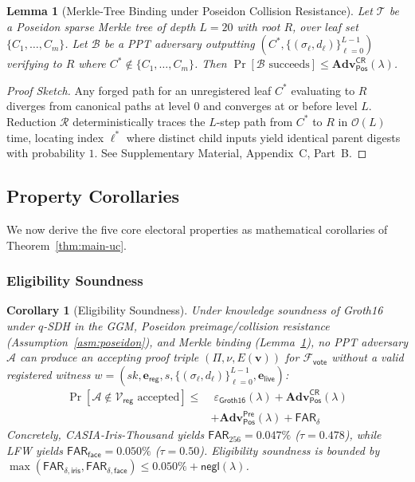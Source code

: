 \documentclass[10pt,letterpaper,journal]{IEEEtran}
\newtheorem{lemma}[theorem]{Lemma}
\newtheorem{corollary}[theorem]{Corollary}
\begin{document}
\begin{lemma}[Merkle-Tree Binding under Poseidon Collision Resistance]
\label{lem:merkle-binding}
Let $\mathcal{T}$ be a Poseidon sparse Merkle tree of depth $L=20$ with root $R$, over leaf set $\{C_1,\ldots,C_m\}$. Let $\mathcal{B}$ be a PPT adversary outputting $(C^\ast, \{(\sigma_\ell, d_\ell)\}_{\ell=0}^{L-1})$ verifying to $R$ where $C^\ast \notin \{C_1,\ldots,C_m\}$. Then $\Pr[\mathcal{B}\text{ succeeds}] \leq \mathbf{Adv}^{\mathsf{CR}}_{\mathsf{Pos}}(\lambda)$.
\end{lemma}

\begin{proof}[Proof Sketch]
Any forged path for an unregistered leaf $C^\ast$ evaluating to $R$ diverges from canonical paths at level 0 and converges at or before level $L$. Reduction $\mathcal{R}$ deterministically traces the $L$-step path from $C^\ast$ to $R$ in $\mathcal{O}(L)$ time, locating index $\ell^\ast$ where distinct child inputs yield identical parent digests with probability $1$. See Supplementary Material, Appendix~C, Part~B.
\end{proof}

\subsection{Property Corollaries}
\label{sec:corollaries}
We now derive the five core electoral properties as mathematical corollaries of Theorem~\ref{thm:main-uc}.

\subsubsection{Eligibility Soundness}
\label{sec:eligibility}

\begin{corollary}[Eligibility Soundness]
\label{thm:eligibility}
Under knowledge soundness of Groth16 under $q$-SDH in the GGM, Poseidon preimage/collision resistance (Assumption~\ref{asm:poseidon}), and Merkle binding (Lemma~\ref{lem:merkle-binding}), no PPT adversary $\mathcal{A}$ can produce an accepting proof triple $(\Pi, \nu, E(\mathbf{v}))$ for $\mathcal{F}_{\mathsf{vote}}$ without a valid registered witness $w = (\mathit{sk}, \mathbf{e}_{\mathsf{reg}}, s, \{(\sigma_\ell, d_\ell)\}_{\ell=0}^{L-1}, \mathbf{e}_{\mathsf{live}})$:
\begin{equation}
\label{eq:eligibility-bound}
\begin{split}
  \Pr[\mathcal{A} \notin \mathcal{V}_{\mathsf{reg}} \text{ accepted}] \leq &\;\varepsilon_{\mathsf{Groth16}}(\lambda) + \mathbf{Adv}^{\mathsf{CR}}_{\mathsf{Pos}}(\lambda) \\
  &+ \mathbf{Adv}^{\mathsf{Pre}}_{\mathsf{Pos}}(\lambda) + \mathsf{FAR}_\delta
\end{split}
\end{equation}
Concretely, CASIA-Iris-Thousand yields $\mathsf{FAR}_{256} = 0.047\%$ ($\tau = 0.478$), while LFW yields $\mathsf{FAR}_{\mathsf{face}} = 0.050\%$ ($\tau=0.50$). Eligibility soundness is bounded by $\max(\mathsf{FAR}_{\delta,\mathsf{iris}}, \mathsf{FAR}_{\delta,\mathsf{face}}) \leq 0.050\% + \mathsf{negl}(\lambda)$.
\end{corollary}
\end{document}
